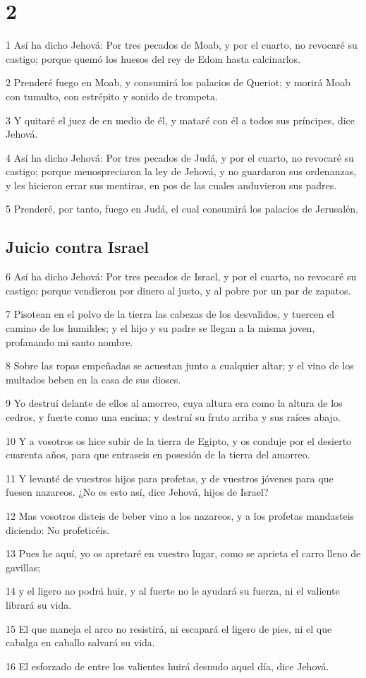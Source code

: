 \chapter{2}

\par 1 Así ha dicho Jehová: Por tres pecados de Moab, y por el cuarto, no revocaré su castigo; porque quemó los huesos del rey de Edom hasta calcinarlos.
\par 2 Prenderé fuego en Moab, y consumirá los palacios de Queriot; y morirá Moab con tumulto, con estrépito y sonido de trompeta.
\par 3 Y quitaré el juez de en medio de él, y mataré con él a todos sus príncipes, dice Jehová.
\par 4 Así ha dicho Jehová: Por tres pecados de Judá, y por el cuarto, no revocaré su castigo; porque menospreciaron la ley de Jehová, y no guardaron sus ordenanzas, y les hicieron errar sus mentiras, en pos de las cuales anduvieron sus padres.
\par 5 Prenderé, por tanto, fuego en Judá, el cual consumirá los palacios de Jerusalén.

\section*{Juicio contra Israel}

\par 6 Así ha dicho Jehová: Por tres pecados de Israel, y por el cuarto, no revocaré su castigo; porque vendieron por dinero al justo, y al pobre por un par de zapatos.
\par 7 Pisotean en el polvo de la tierra las cabezas de los desvalidos, y tuercen el camino de los humildes; y el hijo y su padre se llegan a la misma joven, profanando mi santo nombre.
\par 8 Sobre las ropas empeñadas se acuestan junto a cualquier altar; y el vino de los multados beben en la casa de sus dioses.
\par 9 Yo destruí delante de ellos al amorreo, cuya altura era como la altura de los cedros, y fuerte como una encina; y destruí su fruto arriba y sus raíces abajo.
\par 10 Y a vosotros os hice subir de la tierra de Egipto, y os conduje por el desierto cuarenta años, para que entraseis en posesión de la tierra del amorreo.
\par 11 Y levanté de vuestros hijos para profetas, y de vuestros jóvenes para que fuesen nazareos. ¿No es esto así, dice Jehová, hijos de Israel?
\par 12 Mas vosotros disteis de beber vino a los nazareos, y a los profetas mandasteis diciendo: No profeticéis.
\par 13 Pues he aquí, yo os apretaré en vuestro lugar, como se aprieta el carro lleno de gavillas;
\par 14 y el ligero no podrá huir, y al fuerte no le ayudará su fuerza, ni el valiente librará su vida.
\par 15 El que maneja el arco no resistirá, ni escapará el ligero de pies, ni el que cabalga en caballo salvará su vida.
\par 16 El esforzado de entre los valientes huirá desnudo aquel día, dice Jehová.

